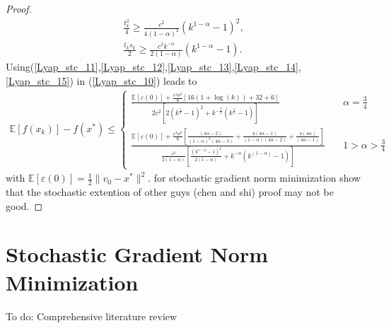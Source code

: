 \documentclass{article}
\theoremstyle{plain}
\theoremstyle{definition}
\theoremstyle{remark}
\begin{document}
\begin{proof}
\begin{align}
             \frac{t_k^2}{4}\geq \frac{c^2}{4(1-\alpha)^2}(k^{1-\alpha}-1)^2,\nonumber\\
             \frac{t_ks_k}{2}\geq \frac{c^2k^{-\alpha}}{2(1-\alpha)}(k^{1-\alpha}-1).
         \end{align}
Using(\ref{Lyap_stc_11},\ref{Lyap_stc_12},\ref{Lyap_stc_13},\ref{Lyap_stc_14},\ref{Lyap_stc_15}) in (\ref{Lyap_stc_10}) leads to
\begin{align}\label{Lyap_stc_16}
    \mathbb E[f(x_k)]-f(x^*)\leq \left\{\begin{array}{lr}
         \frac{\mathbb E[\varepsilon (0)]+\frac{c^4\sigma^2}{8}\left[16(1+\log(k))+32+6\right]}{2c^2\left[2(k^{\frac{1}{4}}-1)^2+k^{-\frac{3}{4}}(k^{\frac{1}{4}}-1)\right]} & \quad \alpha=\frac{3}{4} \\
          \frac{\mathbb E[\varepsilon (0)]+\frac{c^4\sigma^2}{8}\left[\frac{(4\alpha -2)}{(1-\alpha)^2(4\alpha-3)}+\frac{4(4\alpha -1)}{(1-\alpha)(4\alpha -2)}+\frac{4(4\alpha )}{(4\alpha -1)}\right]}{\frac{c^2}{2(1-\alpha)}\left[\frac{(k^{1-\alpha}-1)^2}{2(1-\alpha)}+k^{-\alpha}(k^{(1-\alpha)}-1)\right]}& \quad 1>\alpha>\frac{3}{4}
    \end{array}\right.
\end{align}
with $\mathbb E[\varepsilon (0)]=\frac{1}{2}\|v_0-x^*\|^2$.
for stochastic gradient norm minimization show that the stochastic extention of other guys (chen and shi) proof may not be good.
\end{proof}
\section{Stochastic Gradient Norm Minimization}
To do: Comprehensive literature review
\end{document}
